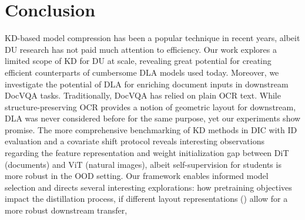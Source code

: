 \documentclass[runningheads]{llncs}
\begin{document}
\section{Conclusion}
KD-based model compression has been a popular technique in recent years, albeit DU research has not paid much attention to efficiency.
Our work explores a limited scope of KD for DU at scale, revealing great potential for creating efficient counterparts of cumbersome DLA models used today.
Moreover, we investigate the potential of DLA for enriching document inputs in downstream DocVQA tasks.
Traditionally, DocVQA has relied on plain OCR text. While structure-preserving OCR provides a notion of geometric layout for downstream, DLA was never considered before for the same purpose, yet our experiments show promise. 
The more comprehensive benchmarking of KD methods in DIC with ID evaluation and a covariate shift protocol reveals interesting observations regarding the feature representation and weight initialization gap between DiT (documents) and ViT (natural images), albeit self-supervision for students is more robust in the OOD setting.
Our framework enables informed model selection and directs several interesting explorations: how pretraining objectives impact the distillation process, if different layout representations (\eg \cite{huang2022layoutlmv3,appalaraju2021docformer,li2021selfdoc,tang2023unifying,zhu-etal-2023-beyond-layout}) allow for a more robust downstream transfer, \etc



\end{document}
